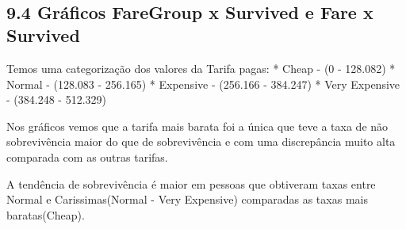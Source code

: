 \documentclass[11pt]{article}
\begin{document}
    \begin{center}
    \end{center}
    { \hspace*{\fill} \\}
    
    \begin{center}
    \end{center}
    { \hspace*{\fill} \\}
    
    \begin{center}
    \end{center}
    { \hspace*{\fill} \\}
    
    \begin{center}
    \end{center}
    { \hspace*{\fill} \\}
    
    \subsection{9.4 Gráficos FareGroup x Survived e Fare x
Survived}\label{gruxe1ficos-faregroup-x-survived-e-fare-x-survived}

Temos uma categorização dos valores da Tarifa pagas: * Cheap - (0 -
128.082) * Normal - (128.083 - 256.165) * Expensive - (256.166 -
384.247) * Very Expensive - (384.248 - 512.329)

Nos gráficos vemos que a tarifa mais barata foi a única que teve a taxa
de não sobrevivência maior do que de sobrevivência e com uma
discrepância muito alta comparada com as outras tarifas.

A tendência de sobrevivência é maior em pessoas que obtiveram taxas
entre Normal e Carissimas(Normal - Very Expensive) comparadas as taxas
mais baratas(Cheap).
\end{document}

